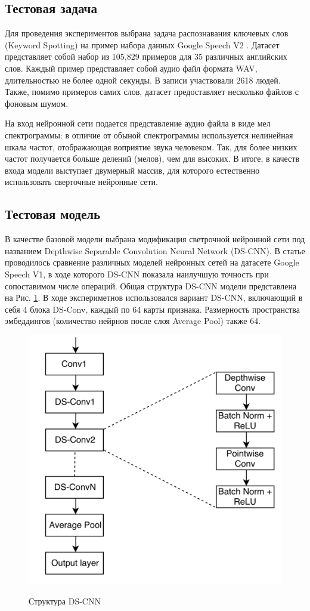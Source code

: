 \subsection{Тестовая задача}
Для проведения экспериментов выбрана задача распознавания ключевых слов (Keyword Spotting) на пример набора данных Google Speech V2 \cite{GoogleSpeechDataset}. Датасет представляет собой набор из 105,829 примеров для 35 различных английских слов. Каждый пример представляет собой аудио файл формата WAV, длительностью не более одной секунды. В записи участвовали 2618 людей. Также, помимо примеров самих слов, датасет предоставляет несколько файлов с фоновым шумом. 

На вход нейронной сети подается представление аудио файла в виде мел спектрограммы: в отличие от обыной спектрограммы используется нелинейная шкала частот, отображающая воприятие звука человеком. Так, для более низких частот получается больше делений (мелов), чем для высоких. В итоге, в качеств входа модели выступает двумерный массив, для которого естественно использовать сверточные нейронные сети.

\subsection{Тестовая модель}
В качестве базовой модели выбрана модификация светрочной нейронной сети под названием Depthwise Separable Convolution Neural Network (DS-CNN). В статье \cite{KeywordSpottingMicrocontrollers} проводилось сравнение различных моделей нейронных сетей на датасете Google Speech V1, в ходе которого DS-CNN показала наилучшую точность при сопоставимом числе операций. Общая структура DS-CNN модели представлена на Рис. \ref{fig:DS_CNN_model}. В ходе экспериметнов использовался вариант DS-CNN, включающий в себя 4 блока DS-Conv, каждый по 64 карты признака. Размерность пространства эмбеддингов (количество нейрнов после слоя Average Pool) также 64.

\begin{figure}[h!]
\caption{Структура DS-CNN}
\centering
\includegraphics[width=16cm]{Images/DS_CNN_model.png}
\label{fig:DS_CNN_model}
\end{figure}